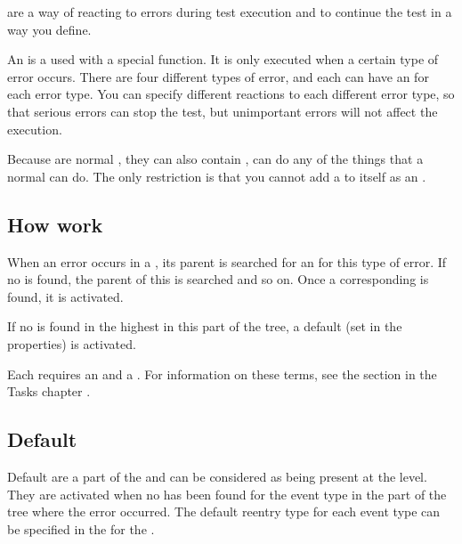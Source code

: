 

 \gdehandlers{} are a way of reacting to errors during test execution and to continue the test in a way you define. 

An \gdehandler{}  is a \gdcase{} used with a special function. It is only executed when a certain type of error occurs. There are four different types of error, and each \gdcase{} can have an \gdehandler{} for each error type.  You can specify different reactions to each different error type, so that serious errors can stop the test, but unimportant errors will not affect the execution.  

Because \gdehandlers{} are normal \gdcases{}, they can also contain \gdehandlers{},  can do any of the things that a normal \gdcase{} can do. The only restriction is that you cannot add a \gdcase{} to itself as an \gdehandler{}. 

\subsection{How \gdehandlers work}
When an error occurs in a \gdstep{}, its parent \gdcase{} is searched for 
an \gdehandler{} for this type of error.
 If no \gdehandler{} is found, the parent \gdcase{} of this 
\gdcase{} is searched and so on. Once a corresponding \gdehandler{} is found, 
it is activated. 

If no \gdehandler{} is found in the highest \gdcase{} in this part of the tree, 
a default \gdehandler{} (set in the \gdsuite{} properties) is activated. 

Each \gdehandler{} requires an  and a
 . For information on these terms, see the section in the Tasks chapter .  

\subsection{Default \gdehandlers{}}
Default \gdehandlers{} are a part of the \gdsuite{} and can be considered 
as being present at the \gdsuite{} level. They  are activated when 
no \gdehandler{} has been found for the event type in the part of the tree
where the error occurred. The default reentry type for each 
event type can be specified in the \gdpropview{} for the \gdtestsuiteeditor{}. 


